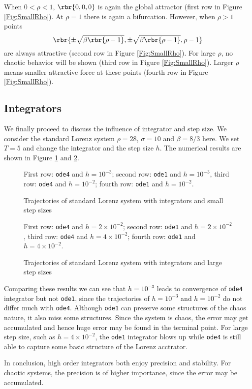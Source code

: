 \documentclass[english, nochinese]{pnote}
\begin{document}
When $ 0 < \rho < 1 $, $ \rbr{ 0, 0, 0 } $ is again the global attractor (first row in Figure \ref{Fig:SmallRho}). At $ \rho = 1 $ there is again a bifurcation. However, when $ \rho > 1 $ points
\begin{equation}
\rbr{ \pm \sqrt{ \beta \rbr{ \rho - 1 } }, \pm \sqrt{ \beta \rbr{ \rho - 1 } }, \rho - 1 }
\end{equation}
are always attractive (second row in Figure \ref{Fig:SmallRho}). For large $\rho$, no chaotic behavior will be shown (third row in Figure \ref{Fig:SmallRho}). Larger $\rho$ means smaller attractive force at these points (fourth row in Figure \ref{Fig:SmallRho}).

\subsection{Integrators}

We finally proceed to discuss the influence of integrator and step size. We consider the standard Lorenz system $ \rho = 28 $, $ \sigma = 10 $ and $ \beta = 8 / 3 $ here. We set $ T = 5 $ and change the integrator and the step size $h$. The numerical results are shown in Figure \ref{Fig:Int1} and \ref{Fig:Int2}.

\begin{figure}[htbp]
{
\centering
\scalebox{0.5}{}
\scalebox{0.5}{}
\scalebox{0.5}{}
\scalebox{0.5}{}
\caption{Trajectories of standard Lorenz system with integrators and small step sizes}
\label{Fig:Int1}
}
{
\footnotesize First row: \texttt{ode4} and $ h = 10^{-3} $; second row: \texttt{ode1} and $ h = 10^{-3} $, third row: \texttt{ode4} and $ h = 10^{-2} $; fourth row: \texttt{ode1} and $ h = 10^{-2} $.
}
\end{figure}

\begin{figure}[htbp]
{
\centering
\scalebox{0.5}{}
\scalebox{0.5}{}
\scalebox{0.5}{}
\scalebox{0.5}{}
\caption{Trajectories of standard Lorenz system with integrators and large step sizes}
\label{Fig:Int2}
}
{
\footnotesize First row: \texttt{ode4} and $ h = 2 \times 10^{-2} $; second row: \texttt{ode1} and $ h = 2 \times 10^{-2} $, third row: \texttt{ode4} and $ h = 4 \times 10^{-2} $; fourth row: \texttt{ode1} and $ h = 4 \times 10^{-2} $.
}
\end{figure}

Comparing these results we can see that $ h = 10^{-3} $ leads to convergence of \verb"ode4" integrator but not \verb"ode1", since the trajectories of $ h = 10^{-3} $ and $ h = 10^{-2} $ do not differ much with \verb"ode4". Although \verb"ode1" can preserve some structures of the chaos nature, it also miss some structures. Since the system is chaos, the error may get accumulated and hence huge error may be found in the terminal point. For large step size, such as $ h = 4 \times 10^{-2} $, the \verb"ode1" integrator blows up while \verb"ode4" is still able to capture some basic structure of the Lorenz acctrator.

In conclusion, high order integrators both enjoy precision and stability. For chaotic systems, the precision is of higher importance, since the error may be accumulated.
\end{document}

